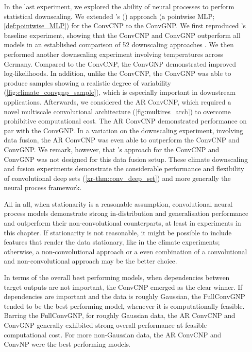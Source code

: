 \documentclass[12pt, twoside]{report}
\newcommand{\xrprefix}[1]{xr-#1}
\begin{document}
In the last experiment, we explored the ability of neural processes to perform statistical downscaling.
We extended \citeauthor{Vaughan:2022:Convolutional_Conditional_Neural_Processes_for}'s (\citeyear{Vaughan:2022:Convolutional_Conditional_Neural_Processes_for}) approach (a pointwise MLP; \cref{def:pointwise_MLP}) for the ConvCNP to the ConvGNP.
We first reproduced \citeauthor{Vaughan:2022:Convolutional_Conditional_Neural_Processes_for}'s baseline experiment, showing that the ConvCNP and ConvGNP outperform all models in an established comparison of 52 downscaling approaches \parencite[\url{http://www.value-cost.eu};][]{Maraun:2015:VALUE_A_Framework_to_Validate,Gutirrez:2019:An_Intercomparison_of_a_Large}.
We then performed another downscaling experiment involving temperatures across Germany.
Compared to the ConvCNP, the ConvGNP demonstrated improved log-likelihoods.
In addition, unlike the ConvCNP, the ConvGNP was able to produce samples showing a realistic degree of variability (\cref{fig:climate_convgnp_sample}), which is especially important in downstream applications.
Afterwards, we considered the AR ConvCNP, which required a novel multiscale convolutional architecture (\cref{fig:multires_arch}) to overcome prohibitive computational cost.
The AR ConvCNP demonstrated performance on par with the ConvGNP.
In a variation on the downscaling experiment, involving data fusion, the AR ConvCNP was even able to outperform the ConvCNP and ConvGNP.
We remark, however, that \citeauthor{Vaughan:2022:Convolutional_Conditional_Neural_Processes_for}'s approach for the ConvCNP and ConvGNP was not designed for this data fusion setup. 
These climate downscaling and fusion experiments demonstrate the considerable performance and flexibility of convolutional deep sets (\cref{\xrprefix{thm:conv_deep_set}}) and more generally the neural process framework.

All in all, when stationarity is a reasonable assumption,
convolutional neural process models
demonstrate strong in-distribution and generalisation performance and
outperform their non-convolutional counterparts,
at least in experiments in this chapter.
If stationarity is not reasonable, it might be possible to include features that render the data stationary, like in the climate experiments;
otherwise, a non-convolutional approach or a even combination of a convolutional and non-convolutional approach may be the better choice.

In terms of the overall best performing models,
when dependencies between target outputs are not important, the ConvCNP emerged as the clear winner.
If dependencies are important and the data is roughly Gaussian, the FullConvGNP tended to be the best performing model, whenever it is computationally feasible.
Barring the FullConvGNP, for roughly Gaussian data, the AR ConvCNP and ConvGNP generally exhibited strong overall performance at feasible computational cost.
For more non-Gaussian data, the AR ConvCNP and ConvNP were the best performing models.
\end{document}
